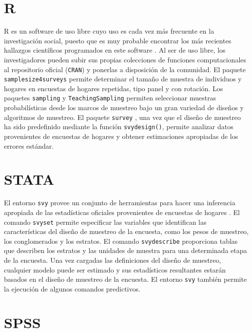 \documentclass[
  12pt,
]{book}
\begin{document}
\hypertarget{r}{%
\section{R}\label{r}}

R es un software de uso libre cuyo uso es cada vez más frecuente en la investigación social, puesto que es muy probable encontrar los más recientes hallazgos científicos programados en este software \citep{R_2019}. Al ser de uso libre, los investigadores pueden subir sus propias colecciones de funciones computacionales al repositorio oficial (\texttt{CRAN}) y ponerlas a disposición de la comunidad. El paquete \texttt{samplesize4surveys} \citep{ss4s} permite determinar el tamaño de muestra de individuos y hogares en encuestas de hogares repetidas, tipo panel y con rotación. Los paquetes \texttt{sampling} \citep{Yves} y \texttt{TeachingSampling} \citep{TS} permiten seleccionar muestras probabilísticas desde los marcos de muestreo bajo un gran variedad de diseños y algoritmos de muestreo. El paquete \texttt{survey} \citep{TL}, una vez que el diseño de muestreo ha sido predefinido mediante la función \texttt{svydesign()}, permite analizar datos provenientes de encuestas de hogares y obtener estimaciones apropiadas de los errores estándar.

\hypertarget{stata}{%
\section{STATA}\label{stata}}

El entorno \texttt{svy} provee un conjunto de herramientas para hacer una inferencia apropiada de las estadísticas oficiales provenientes de encuestas de hogares \citep{STATA_2017}. El comando \texttt{svyset} permite especificar las variables que identifican las características del diseño de muestreo de la encuesta, como los pesos de muestreo, los conglomerados y los estratos. El comando \texttt{svydescribe} proporciona tablas que describen los estratos y las unidades de muestra para una determinada etapa de la encuesta. Una vez cargadas las definiciones del diseño de muestreo, cualquier modelo puede ser estimado y sus estadísticos resultantes estarán basados en el diseño de muestreo de la encuesta. El entorno \texttt{svy} también permite la ejecución de algunos comandos predictivos.

\hypertarget{spss}{%
\section{SPSS}\label{spss}}
\end{document}
